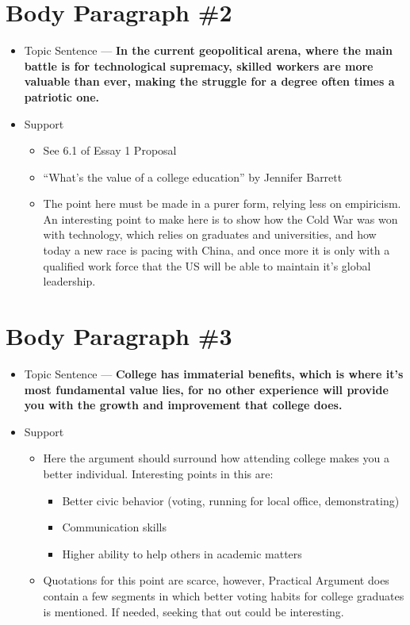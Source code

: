\documentclass{article}
\begin{document}
\section{Body Paragraph \#2}
\begin{itemize}
    \item Topic Sentence --- \textbf{In the current geopolitical arena, where
    the main battle is for technological supremacy, skilled workers are more 
    valuable than ever, making the struggle for a degree often times a 
    patriotic one.}
    \item Support
    \begin{itemize}
        \item See 6.1 of Essay 1 Proposal
        \item “What’s the value of a college education” by Jennifer Barrett
        \item The point here must be made in a purer form, relying less on
        empiricism. An interesting point to make here is to show how the Cold War
        was won with technology, which relies on graduates and universities,
        and how today a new race is pacing with China, and once more it is only
        with a qualified work force that the US will be able to maintain it's global
        leadership.
    \end{itemize}
\end{itemize}
\newpage
\section{Body Paragraph \#3}
\begin{itemize}
    \item Topic Sentence --- \textbf{College has immaterial benefits, which is where it's
    most fundamental value lies, for no other experience will provide you with the growth 
    and improvement that college does.}
    \item Support
    \begin{itemize}
        \item Here the argument should surround how attending college makes you a better
        individual. Interesting points in this are:
        \begin{itemize}
            \item Better civic behavior (voting, running for local office, demonstrating)
            \item Communication skills
            \item Higher ability to help others in academic matters
        \end{itemize}
        \item Quotations for this point are scarce, however, Practical Argument does
        contain a few segments in which better voting habits for college graduates is 
        mentioned. If needed, seeking that out could be interesting.
    \end{itemize}
\end{itemize}
\end{document}
